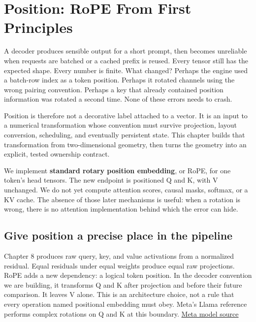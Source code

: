 \chapter{Position: RoPE From First Principles}\label{chapter-9---position-rope-from-first-principles}
A decoder produces sensible output for a short prompt, then becomes
unreliable when requests are batched or a cached prefix is reused. Every
tensor still has the expected shape. Every number is finite. What
changed? Perhaps the engine used a batch-row index as a token position.
Perhaps it rotated channels using the wrong pairing convention. Perhaps
a key that already contained position information was rotated a second
time. None of these errors needs to crash.

Position is therefore not a decorative label attached to a vector. It is
an input to a numerical transformation whose convention must survive
projection, layout conversion, scheduling, and eventually persistent
state. This chapter builds that transformation from two-dimensional
geometry, then turns the geometry into an explicit, tested ownership
contract.

We implement \textbf{standard rotary position embedding}, or RoPE, for
one token's head tensors. The new endpoint is positioned Q and K, with V
unchanged. We do not yet compute attention scores, causal masks,
softmax, or a KV cache. The absence of those later mechanisms is useful:
when a rotation is wrong, there is no attention implementation behind
which the error can hide.

\section{Give position a precise place in the
pipeline}\label{give-position-a-precise-place-in-the-pipeline}


Chapter 8 produces raw query, key, and value activations from a
normalized residual. Equal residuals under equal weights produce equal
raw projections. RoPE adds a new dependency: a logical token position.
In the decoder convention we are building, it transforms Q and K after
projection and before their future comparison. It leaves V alone. This
is an architecture choice, not a rule that every operation named
positional embedding must obey. Meta's Llama reference performs complex
rotations on Q and K at this boundary.
\href{https://raw.githubusercontent.com/meta-llama/llama-models/main/models/llama3/model.py}{Meta
model source}

